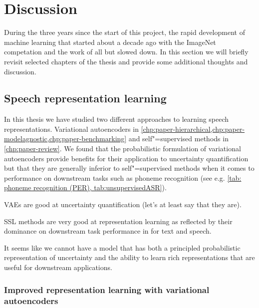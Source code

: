 
\chapter[discussion]{Discussion}\label{chp:discussion}
%

During the three years since the start of this project, the rapid development of machine learning that started about a decade ago with the ImageNet competation and the work of \textcite{krizhevsky_imagenet_2012} all but slowed down. 
In this section we will briefly revisit selected chapters of the thesis and provide some additional thoughts and discussion. 


\section{Speech representation learning}
%
In this thesis we have studied two different approaches to learning speech representations. Variational autoencoders in \cref{chp:paper-hierarchical,chp:paper-modelagnostic,chp:paper-benchmarking} and self"=supervised methods in \cref{chp:paper-review}. 
We found that the probabilistic formulation of variational autoencoders provide benefits for their application to uncertainty quantification but that they are generally inferior to self"=supervised methods when it comes to performance on downstream tasks such as phoneme recognition (see e.g. \cref{tab: phoneme recognition (PER), tab:unsupervisedASR}). 

VAEs are good at uncertainty quantification (let's at least say that they are).

SSL methods are very good at representation learning as reflected by their dominance on downstream task performance in for text and speech.

It seems like we cannot have a model that has both a principled probabilistic representation of uncertainty and the ability to learn rich representations that are useful for downstream applications. 




\subsection{Improved representation learning with variational autoencoders}

